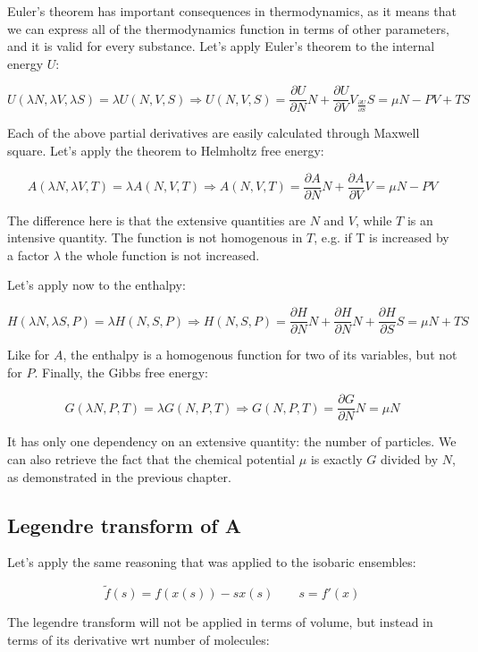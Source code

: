 	Euler's theorem has important consequences in thermodynamics, as it means that we can express all of the thermodynamics function in terms of other parameters, and it is valid for every substance.
	Let's apply Euler's theorem to the internal energy $U$: 

	$$U(\lambda N, \lambda V, \lambda S) = \lambda U(N, V, S)\Rightarrow U(N, V, S) = \frac{\partial U}{\partial N}N + \frac{\partial U}{\partial V}V_\frac{\partial U}{\partial S}S = \mu N - PV + TS$$
	
	Each of the above partial derivatives are easily calculated through Maxwell square.
	Let's apply the theorem to Helmholtz free energy:

	$$A(\lambda N, \lambda V, T) = \lambda A(N, V, T) \Rightarrow A(N, V, T) = \frac{\partial A}{\partial N}N + \frac{\partial A}{\partial V}V = \mu N - PV$$

The difference here is that the extensive quantities are $N$ and $V$, while $T$ is an intensive quantity.  
The function is not homogenous in $T$, e.g. if T is increased by a factor $\lambda$ the whole function is not increased.

Let's apply now to the enthalpy:

	$$H(\lambda N, \lambda S, P) = \lambda H(N, S, P)\Rightarrow H(N, S, P) = \frac{\partial H}{\partial N}N+\frac{\partial H}{\partial N}N+\frac{\partial H}{\partial S}S = \mu N+TS$$
	
	Like for $A$, the enthalpy is a homogenous function for two of its variables, but not for $P$.
	Finally, the Gibbs free energy:

	$$G(\lambda N, P, T) = \lambda G(N, P, T)\Rightarrow G(N, P, T) = \frac{\partial G}{\partial N}N= \mu N$$

It has only one dependency on an extensive quantity: the number of particles. 
We can also retrieve the fact that the chemical potential $\mu$ is exactly $G$ divided by $N$, as demonstrated in the previous chapter. 

	\subsection{Legendre transform of A}
	Let's apply the same reasoning that was applied to the isobaric ensembles:

	$$\tilde{f}(s) = f(x(s))-sx(s)\qquad s = f'(x)$$

	The legendre transform will not be applied in terms of volume, but instead in terms of its derivative wrt number of molecules:
	
